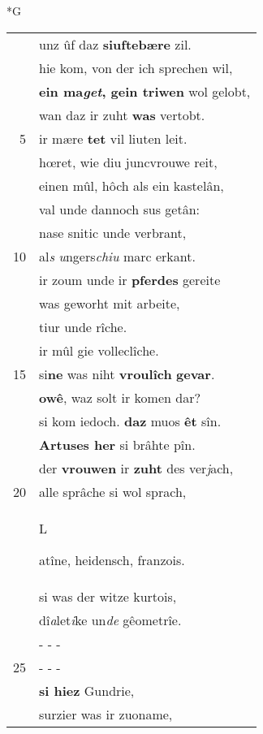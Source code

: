 \documentclass[8pt,a4paper,notitlepage]{article}
\begin{document}
\begin{table}[ht]
\begin{minipage}[t]{0.5\linewidth}
\small
\begin{center}*G
\end{center}
\begin{tabular}{rl}
 & unz ûf daz \textbf{siuftebære} zil.\\ 
 & hie kom, von der ich sprechen wil,\\ 
 & \textbf{ein ma\textit{get}, gein triwen} wol gelobt,\\ 
 & wan daz ir zuht \textbf{was} vertobt.\\ 
5 & ir mære \textbf{tet} vil liuten leit.\\ 
 & hœret, wie diu juncvrouwe reit,\\ 
 & einen mûl, hôch als ein kastelân,\\ 
 & val unde dannoch sus getân:\\ 
 & nase snitic unde verbrant,\\ 
10 & al\textit{s} \textit{u}ngers\textit{chiu} marc erkant.\\ 
 & ir zoum unde ir \textbf{pferdes} gereite\\ 
 & was geworht mit arbeite,\\ 
 & tiur unde rîche.\\ 
 & ir mûl gie volleclîche.\\ 
15 & si\textbf{ne} was niht \textbf{vroulîch} \textbf{gevar}.\\ 
 & \textbf{owê}, waz solt ir komen dar?\\ 
 & si kom iedoch. \textbf{daz} muos \textbf{êt} sîn.\\ 
 & \textbf{Artuses her} si brâhte pîn.\\ 
 & der \textbf{vrouwen} ir \textbf{zuht} des ver\textit{j}ach,\\ 
20 & alle sprâche si wol sprach,\\ 
 & \begin{large}L\end{large}atîne, heidensch, franzois.\\ 
 & si was der witze kurtois,\\ 
 & dî\textit{a}let\textit{i}ke un\textit{de} gêometrîe.\\ 
 & \multicolumn{1}{l}{ - - - }\\ 
25 & \multicolumn{1}{l}{ - - - }\\ 
 & \textbf{si hiez} Gundrie,\\ 
 & surzier was ir zuoname,\\ 

\end{tabular}
\end{minipage}
\end{table}
\end{document}
